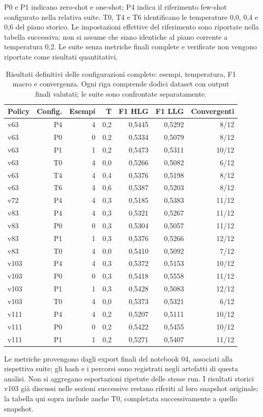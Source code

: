 P0 e P1 indicano zero-shot e one-shot; P4 indica il riferimento
few-shot configurato nella relativa suite. T0, T4 e T6 identificano le
temperature 0,0, 0,4 e 0,6 del piano storico. Le impostazioni effettive
del riferimento sono riportate nella tabella successiva: non si assume
che siano identiche al piano corrente a temperatura 0,2.
Le suite senza metriche finali complete e verificate non vengono
riportate come risultati quantitativi.
\begin{table}[htbp]
\centering\small
\caption{Risultati definitivi delle configurazioni complete: esempi, temperatura, F1 macro e convergenza. Ogni riga comprende dodici dataset con output finali valutati; le suite sono confrontate separatamente.}\label{tab:completed-all-cohorts}
\begin{tabular}{lrrrrrr}
\toprule
Policy & Config. & Esempi & T & F1 HLG & F1 LLG & Convergenti \\
\midrule
v63 & P4 & 4 & 0,2 & 0,5445 & 0,5292 & 8/12 \\
v63 & P0 & 0 & 0,2 & 0,5334 & 0,5079 & 8/12 \\
v63 & P1 & 1 & 0,2 & 0,5473 & 0,5311 & 10/12 \\
v63 & T0 & 4 & 0,0 & 0,5266 & 0,5082 & 6/12 \\
v63 & T4 & 4 & 0,4 & 0,5376 & 0,5198 & 8/12 \\
v63 & T6 & 4 & 0,6 & 0,5387 & 0,5203 & 8/12 \\
v72 & P4 & 4 & 0,3 & 0,5185 & 0,5383 & 11/12 \\
v83 & P4 & 4 & 0,3 & 0,5321 & 0,5267 & 11/12 \\
v83 & P0 & 0 & 0,3 & 0,5304 & 0,5057 & 11/12 \\
v83 & P1 & 1 & 0,3 & 0,5376 & 0,5266 & 12/12 \\
v83 & T0 & 4 & 0,0 & 0,5410 & 0,5092 & 7/12 \\
v103 & P4 & 4 & 0,3 & 0,5372 & 0,5153 & 10/12 \\
v103 & P0 & 0 & 0,3 & 0,5418 & 0,5558 & 11/12 \\
v103 & P1 & 1 & 0,3 & 0,5428 & 0,5083 & 12/12 \\
v103 & T0 & 4 & 0,0 & 0,5373 & 0,5321 & 6/12 \\
v111 & P4 & 4 & 0,2 & 0,5207 & 0,5111 & 10/12 \\
v111 & P0 & 0 & 0,2 & 0,5422 & 0,5455 & 10/12 \\
v111 & P1 & 1 & 0,2 & 0,5271 & 0,5407 & 11/12 \\
\bottomrule
\end{tabular}
\end{table}
Le metriche provengono dagli export finali del notebook 04,
associati alla rispettiva suite; gli hash e i percorsi sono registrati
negli artefatti di questa analisi. Non si aggregano esportazioni ripetute
delle stesse run. I risultati storici v103 gi\`a discussi nelle sezioni
successive restano riferiti al loro snapshot originale; la tabella
qui sopra include anche T0, completata successivamente a quello snapshot.

